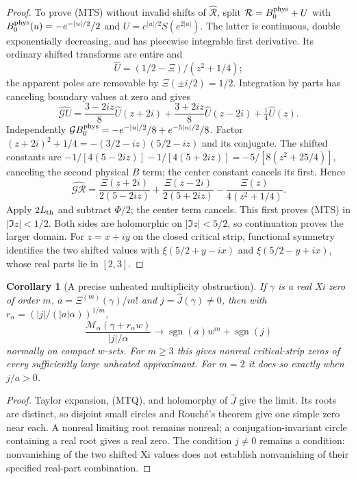\documentclass[11pt]{article}
\newtheorem{corollary}[theorem]{Corollary}
\theoremstyle{remark}\newtheorem{remark}[theorem]{Remark}
\begin{document}
\begin{proof}
To prove (MTS) without invalid shifts of $\widehat{\mathcal R}$,
split $\mathcal R=B_0^{\rm phys}+U$ with
$B_0^{\rm phys}(u)=-e^{-|u|/2}/2$ and
$U=e^{|u|/2}S(e^{2|u|})$. The latter is continuous,
double exponentially decreasing, and has piecewise integrable first
derivative. Its ordinary shifted transforms are entire and
\[
 \widehat U=(1/2-\Xi)/(z^2+1/4);
\]
the apparent poles are removable by $\Xi(\pm i/2)=1/2$.
Integration by parts has canceling boundary values at zero and gives
\[
 \widehat{\mathcal GU}
 =\frac{3-2iz}{8}\widehat U(z+2i)
  +\frac{3+2iz}{8}\widehat U(z-2i)+\tfrac14\widehat U(z).
\]
Independently
$\mathcal GB_0^{\rm phys}=-e^{-|u|/2}/8+e^{-5|u|/2}/8$.
Factor
$(z+2i)^2+1/4=-(3/2-iz)(5/2-iz)$ and its conjugate.
The shifted constants are $-1/[4(5-2iz)]-1/[4(5+2iz)]
=-5/[8(z^2+25/4)]$, canceling the second physical $B$ term;
the center constant cancels its first. Hence
\[
 \widehat{\mathcal G\mathcal R}
 =\frac{\Xi(z+2i)}{2(5-2iz)}
  +\frac{\Xi(z-2i)}{2(5+2iz)}-\frac{\Xi(z)}{4(z^2+1/4)}.
\]
Apply $2L_{\rm th}$ and subtract $\Phi/2$; the center term cancels.
This first proves (MTS) in $|\Im z|<1/2$. Both sides are holomorphic
on $|\Im z|<5/2$, so continuation proves the larger domain.
For $z=x+iy$ on the closed critical strip, functional symmetry
identifies the two shifted values with
$\xi(5/2+y-ix)$ and $\xi(5/2-y+ix)$, whose real parts lie in $[2,3]$.
\end{proof}

\begin{corollary}[A precise unheated multiplicity obstruction]
If $\gamma$ is a real Xi zero of order $m$, $a=\Xi^{(m)}(\gamma)/m!$
and $j=\widehat J(\gamma)\ne0$, then with
$r_\alpha=(|j|/(|a|\alpha))^{1/m}$,
\[
 \frac{\mathcal M_\alpha(\gamma+r_\alpha w)}{|j|/\alpha}
          \longrightarrow\operatorname{sgn}(a)w^m+\operatorname{sgn}(j)
\]
normally on compact $w$-sets. For $m\ge3$ this gives nonreal
critical-strip zeros of every sufficiently large unheated approximant.
For $m=2$ it does so exactly when $j/a>0$.
\end{corollary}
\begin{proof}
Taylor expansion, (MTQ), and holomorphy of $\widehat J$ give the limit.
Its roots are distinct, so disjoint small circles and Rouch\'e's
theorem give one simple zero near each. A nonreal limiting root
remains nonreal; a conjugation-invariant circle containing a real
root gives a real zero. The condition $j\ne0$ remains a condition:
nonvanishing of the two shifted Xi values does not establish
nonvanishing of their specified real-part combination.
\end{proof}
\end{document}
